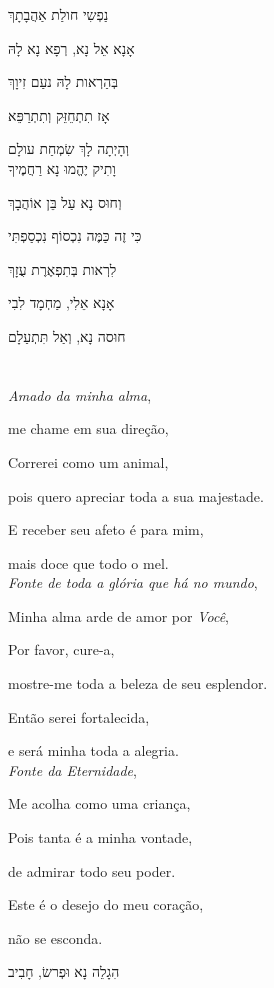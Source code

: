 נַפְשִי חולַת אַהֲבָתָךְ

אָנָא אֵל נָא, רְפָא נָא לָהּ

בְּהַרְאות לָהּ נעַם זִיוָךְ

אָז תִתְחֵזֵּק וְתִתְרַפֵּא

וְהָיְתָה לָךְ שִׂמְחַת עולָם\\[10pt]

וָתִיק יֶהֱמוּ נָא רַחֲמֶיךָ

וְחוּס נָא עַל בֵּן אוֹהֲבָךְ

כִּי זֶה כַּמֶּה נִכְסוֹף נִכְסַפְתִּי

לִרְאות בְּתִפְאֶרֶת עֻזָךְ

אָנָא אֵלִי, מַחְמָד לִבִי

חוּסה נָא, וְאַל תִּתְעַלָם


\movetooddpage
\raggedright

\section{}

\emph{Amado da minha alma},

me chame em sua direção,

Correrei como um animal,

pois quero apreciar toda a sua majestade.

E receber seu afeto é para mim,

mais doce que todo o mel.\\[10pt]

\emph{Fonte de toda a glória que há no mundo},

Minha alma arde de amor por \emph{Você},

Por favor, cure-a,

mostre-me toda a beleza de seu esplendor.

Então serei fortalecida,

e será minha toda a alegria.\\[10pt]

\emph{Fonte da Eternidade},

Me acolha como uma criança,

Pois tanta é a minha vontade,

de admirar todo seu poder.

Este é o desejo do meu coração,

não se esconda.


\movetoevenpage
\raggedleft


הִגָלֵה נָא וּפְרשׂ, חָבִיב

